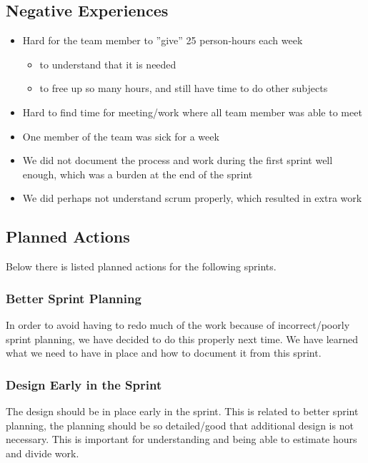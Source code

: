 \subsection{Negative Experiences}
\begin{itemize}
	\item Hard for the team member to ''give'' 25 person-hours each week
	\begin{itemize}
		\item to understand that it is needed
		\item to free up so many hours, and still have time to do other subjects
	\end{itemize}
	\item Hard to find time for meeting/work where all team member was able to meet
	\item One member of the team was sick for a week
	\item We did not document the process and work during the first sprint well enough, which was a burden at the end of the sprint
	\item We did perhaps not understand \Gls{scrum} properly, which resulted in extra work
\end{itemize}

\subsection{Planned Actions}
Below there is listed planned actions for the following sprints.

\subsubsection{Better Sprint Planning}
In order to avoid having to redo much of the work because of incorrect/poorly
sprint planning, we have decided to do this properly next time. We have learned
what we need to have in place and how to document it from this sprint.

\subsubsection{Design Early in the Sprint} 
The design should be in place early in the sprint. This is related to better
sprint planning, the planning should be so detailed/good that additional design
is not necessary. This is important for understanding and being able to
estimate hours and divide work.

